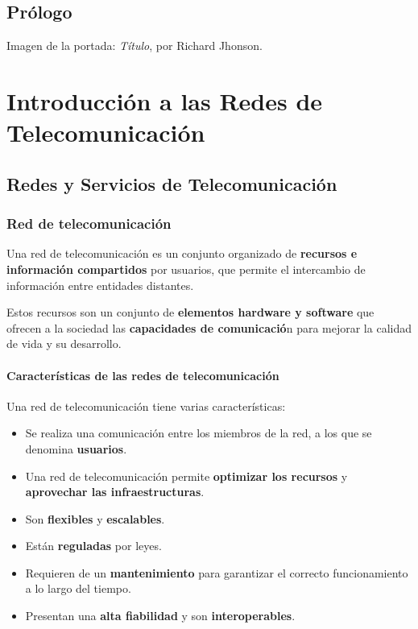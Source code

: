 \documentclass[a4paper]{book}
\begin{document}
\newpage
{}
{}
\section*{Prólogo}
Imagen de la portada: \textsl{Título}, por Richard Jhonson.
\newpage

\setlength{\parskip}{0em}
\tableofcontents
\setlength{\parskip}{0.5em}

\chapter{Introducción a las Redes de Telecomunicación}

\section{Redes y Servicios de Telecomunicación}
\subsection{Red de telecomunicación}
Una red de telecomunicación es un conjunto organizado de \textbf{recursos e información compartidos} por usuarios, que permite el intercambio de información entre entidades distantes.

Estos recursos son un conjunto de \textbf{elementos hardware y software} que ofrecen a la sociedad las \textbf{capacidades de comunicació}n para mejorar la calidad de vida y su desarrollo.

\subsubsection{Características de las redes de telecomunicación}
Una red de telecomunicación tiene varias características:
\begin{itemize}
  \item Se realiza una comunicación entre los miembros de la red, a los que se denomina \textbf{usuarios}.
  \item Una red de telecomunicación permite \textbf{optimizar los recursos} y \textbf{aprovechar las infraestructuras}.
  \item Son \textbf{flexibles} y \textbf{escalables}.
  \item Están \textbf{reguladas} por leyes.
  \item Requieren de un \textbf{mantenimiento} para garantizar el correcto funcionamiento a lo largo del tiempo.
  \item Presentan una \textbf{alta fiabilidad} y son \textbf{interoperables}.
\end{itemize}
\end{document}
